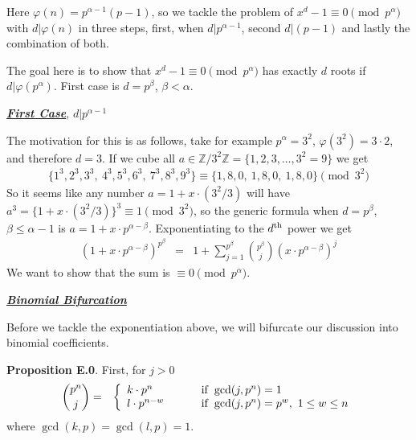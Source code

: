 \documentclass[aps,preprint,preprintnumbers,nofootinbib,showpacs,prd]{revtex4-1}
\newcommand{\nbea}{\begin{eqnarray*}}
\newcommand{\neea}{\end{eqnarray*}}
\begin{document}
Here $\varphi(n) = p^{\alpha-1}(p-1)$, so we tackle the problem of $x^d - 1\equiv 0 \pmod{p^\alpha}$ with $d|\varphi(n)$ in three steps, first, when $d|p^{\alpha-1}$, second $d|(p-1)$ and lastly the combination of both.

The goal here is to show that $x^d - 1 \equiv 0 \pmod{p^\alpha}$ has exactly $d$ roots if $d|\varphi(p^\alpha)$. First case is $d = p^\beta$, $\beta < \alpha$.

\bigskip
\underline{\textit{\textbf{First Case}}}, $d|p^{\alpha-1}$
\bigskip

The motivation for this is as follows, take for example $p^\alpha=3^2$, $\varphi(3^2) = 3\cdot 2$, and therefore $d = 3$. If we cube all $a \in \mathbb{Z}/3^2\mathbb{Z} = \{1,2,3,\dots,3^2 = 9\}$ we get
%
\nbea
\{1^3, 2^3, 3^3,~4^3, 5^3, 6^3,~7^3, 8^3, 9^3\} \equiv \{1, 8, 0,~1, 8, 0,~1, 8, 0\} \pmod{3^2}
\neea
%
So it seems like any number $a = 1 + x\cdot (3^2/3)$ will have $a^3 = \{1+x\cdot (3^2/3)\}^3 \equiv 1 \pmod{3^2}$, so the generic formula when $d = p^\beta$, $\beta \le \alpha - 1$ is $a = 1 + x\cdot p^{\alpha-\beta}$. Exponentiating to the $d^{\rm th}$ power we get
%
\nbea
(1 + x\cdot p^{\alpha-\beta})^{p^\beta} & = & 1 + \sum_{j=1}^{p^\beta}\binom{p^\beta}{j} (x\cdot p^{\alpha-\beta})^j
\neea
%
We want to show that the sum is $\equiv 0 \pmod{p^\alpha}$. 

\smallskip
\underline{\textit{\textbf{Binomial Bifurcation}}}
\smallskip

Before we tackle the exponentiation above, we will bifurcate our discussion into binomial coefficients.

{\bf Proposition E.0}. First, for $j > 0$ 
%
\nbea
\binom{p^n}{j} & = & \left\{
\begin{array}{l l}
k \cdot p^n & ~~~~~~~ {\rm if ~} \gcd(j,p^n) = 1 \\
l \cdot p^{n-w} & ~~~~~~~ {\rm if ~} \gcd(j,p^n) = p^w, ~ 1 \le w \le n
\end{array} \right.
\neea
%
where $\gcd(k,p) = \gcd(l,p) = 1$.
\end{document}
